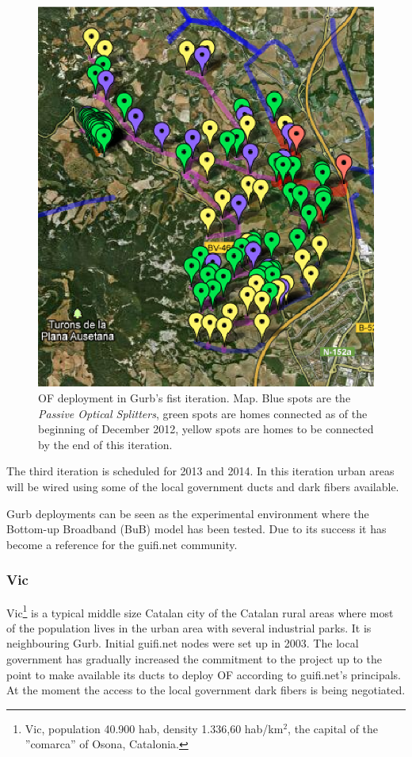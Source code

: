 \begin{figure}[htbp]
  \centering
  \includegraphics[scale=1.3]{sect2/figures/Gurb_it2_map.eps} 
  \caption{OF deployment in Gurb's fist iteration. Map. Blue spots are the \emph{Passive Optical Splitters}, green spots are homes connected as of the beginning of December 2012, yellow spots are homes to be connected by the end of this iteration.}
  \label{fig:gurb_it2_map}
\end{figure}

The third iteration is scheduled for 2013 and 2014. In this iteration urban areas will be wired using some of the local government ducts and dark fibers available.

Gurb deployments can be seen as the experimental environment where the Bottom-up Broadband (BuB) model has been tested. Due to its success it has become a reference for the guifi.net community.

\FloatBarrier
\subsubsection{Vic}

Vic\footnote{Vic, population 40.900 hab, density 1.336,60 hab/km$^{2}$, the capital of the ''comarca'' of Osona, Catalonia.} is a typical middle size Catalan city of the Catalan rural areas where most of the population lives in the urban area with several industrial parks. It is neighbouring Gurb. Initial guifi.net nodes were set up in 2003. The local government has gradually increased the commitment to the project up to the point to make available its ducts to deploy OF according to guifi.net's principals. At the moment the access to the local government dark fibers is being negotiated.

